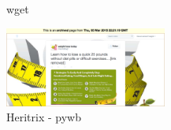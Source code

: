 \documentclass{article}
\begin{document}
\begin{center}
\begin{figure}[ht]
    \caption{wget}
    \label{fig:url1_wget}
\end{figure}
\begin{figure}[ht]
    \centering
    \includegraphics[width=0.475\textwidth,natwidth=700,natheight=700]{ex1-heritrix-pywb.png}
    \caption{Heritrix - pywb}
    \label{fig:url1_heritrix_pywb}
\end{figure}
\end{center}

\clearpage
\end{document}

